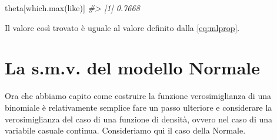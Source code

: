 \documentclass[
  11pt,
]{krantz}
\makeatletter
\newenvironment{Shaded}{\begin{snugshade}}{\end{snugshade}}
\newcommand{\CommentTok}[1]{\textcolor[rgb]{0.37,0.37,0.37}{\textit{#1}}}
\newcommand{\FunctionTok}[1]{\textcolor[rgb]{0,0,0}{#1}}
\newcommand{\NormalTok}[1]{#1}
\newenvironment{kframe}{%
\medskip{}
\setlength{\fboxsep}{.8em}
 \def\at@end@of@kframe{}%
 \ifinner\ifhmode%
  \def\at@end@of@kframe{\end{minipage}}%
  \begin{minipage}{\columnwidth}%
 \fi\fi%
 \def\FrameCommand##1{\hskip\@totalleftmargin \hskip-\fboxsep
 \colorbox{shadecolor}{##1}\hskip-\fboxsep
     \hskip-\linewidth \hskip-\@totalleftmargin \hskip\columnwidth}%
 \MakeFramed {\advance\hsize-\width
   \@totalleftmargin\z@ \linewidth\hsize
   \@setminipage}}%
 {\par\unskip\endMakeFramed%
 \at@end@of@kframe}
\renewenvironment{Shaded}{\begin{kframe}}{\end{kframe}}
\theoremstyle{definition}
\theoremstyle{definition}
\theoremstyle{definition}
\theoremstyle{definition}
\theoremstyle{remark}
\makeatother
\begin{document}
\begin{Shaded}
\begin{Highlighting}[]
\NormalTok{theta[}\FunctionTok{which.max}\NormalTok{(like)]}
\CommentTok{\#\textgreater{} [1] 0.7668}
\end{Highlighting}
\end{Shaded}

Il valore così trovato è uguale al valore definito dalla \eqref{eq:mlprop}.

\hypertarget{derivation-smv-norm}{%
\section{La s.m.v. del modello Normale}\label{derivation-smv-norm}}

Ora che abbiamo capito come costruire la funzione verosimiglianza di una binomiale è relativamente semplice fare un passo ulteriore e considerare la verosimiglianza del caso di una funzione di densità, ovvero nel caso di una variabile casuale continua. Consideriamo qui il caso della Normale.
\end{document}
